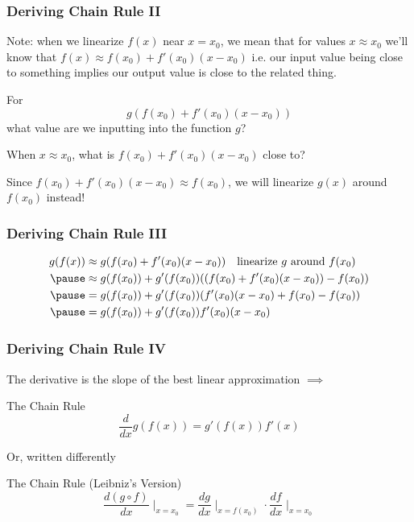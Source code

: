 \documentclass{ltx-talk}
\begin{document}
\begin{frame}
  \frametitle{Deriving Chain Rule II}

  Note: when we linearize $f(x)$ near $x = x_0$, we mean that for values $x \approx x_0$ we'll know that $f(x) \approx f(x_0) + f'(x_0)(x - x_0)$ \pause
  i.e. our input value being close to something implies our output value is close to the related thing. \pause

  For
  \begin{equation*}
    g(f(x_0) + f'(x_0)(x - x_0))
  \end{equation*}
  what value are we inputting into the function $g$? \pause

  When $x \approx x_0$, what is $f(x_0) + f'(x_0)(x - x_0)$ close to? \pause

  Since $f(x_0) + f'(x_0) (x - x_0) \approx f(x_0)$, we will linearize $g(x)$ around $f(x_0)$ instead!
\end{frame}

\begin{frame}
  \frametitle{Deriving Chain Rule III}

  \begin{align}
    g(f(x)) &\approx g(f(x_0) + f'(x_0)( x-x_0)) \quad \text{linearize $g$ around $f(x_0)$} \\ \pause
            &\approx g(f(x_0)) + g'(f(x_0)) ( (f(x_0) + f'(x_0)(x -x_0)) - f(x_0)) \\ \pause
            &= g(f(x_0)) + g'(f(x_0))(f'(x_0)(x - x_0) + f(x_0) - f(x_0)) \\ \pause
            &= g(f(x_0)) + g'(f(x_0))f'(x_0)(x - x_0)
  \end{align} \pause
\end{frame}
\begin{frame}
  \frametitle{Deriving Chain Rule IV}
  The derivative is the slope of the best linear approximation $\implies$ \pause

  \begin{alertblock}{The Chain Rule}
    \begin{equation}
      \dfrac{d}{dx} g(f(x)) = g'(f(x)) f'(x)
    \end{equation}
  \end{alertblock} \pause

  Or, written differently

  \begin{alertblock}{The Chain Rule (Leibniz's Version)}
    \begin{equation}
      \dfrac{d (g \circ f)}{dx} \mid_{x = x_0} = \dfrac{dg}{dx} \mid_{x = f(x_0)} \cdot \dfrac{df}{dx} \mid_{x = x_0}
    \end{equation}
  \end{alertblock}
\end{frame}
\end{document}
